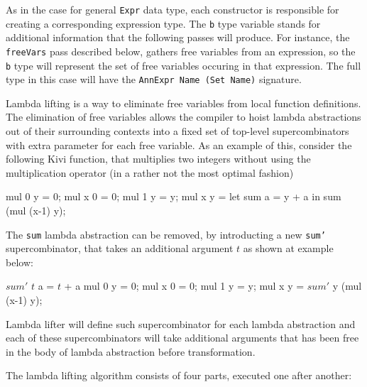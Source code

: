 \documentclass[12pt,a4paper]{report}
\begin{document}
As in the case for general \texttt{Expr} data type, each constructor is
responsible for creating a corresponding expression type. The \texttt{b} type
variable stands for additional information that the following passes will
produce. For instance, the \texttt{freeVars} pass described below, gathers free
variables from an expression, so the \texttt{b} type will represent the set of
free variables occuring in that expression. The full type in this case will
have the \texttt{AnnExpr Name (Set Name)} signature.

Lambda lifting is a way to eliminate free variables from local function
definitions. The elimination of free variables allows the compiler to hoist
lambda abstractions out of their surrounding contexts into a fixed set of
top-level supercombinators with extra parameter for each free variable. As an
example of this, consider the following Kivi function, that multiplies two
integers without using the multiplication operator (in a rather not the most
optimal fashion)

\vspace*{0.2in}
\begin{code}[style=haskell]
  mul 0 y = 0;
  mul x 0 = 0;
  mul 1 y = y;
  mul x y =
      let sum a = y + a
      in sum (mul (x-1) y);
\end{code}

The \texttt{sum} lambda abstraction can be removed, by introducting a new
\texttt{sum'} supercombinator, that takes an additional argument $t$ as shown
at example below:

\vspace*{0.2in}
\begin{code}[style=haskell,mathescape=true]
  $sum'$ $t$ a = $t$ + a
  mul 0 y = 0;
  mul x 0 = 0;
  mul 1 y = y;
  mul x y =
      $sum'$ y (mul (x-1) y);
\end{code}

Lambda lifter will define such supercombinator for each lambda abstraction and
each of these supercombinators will take additional arguments that has been
free in the body of lambda abstraction before transformation.

The lambda lifting algorithm consists of four parts, executed one after another:

\vspace*{0.2in}
\end{document}
